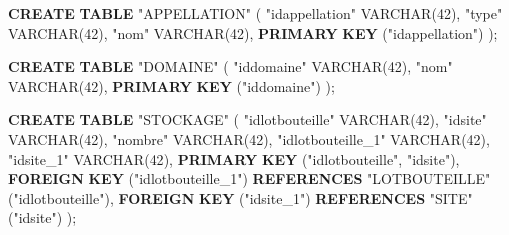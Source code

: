 \documentclass[11pt]{article}
\newenvironment{Shaded}{}{}
\newcommand{\KeywordTok}[1]{\textcolor[rgb]{0.00,0.44,0.13}{\textbf{{#1}}}}
\newcommand{\DataTypeTok}[1]{\textcolor[rgb]{0.56,0.13,0.00}{{#1}}}
\newcommand{\DecValTok}[1]{\textcolor[rgb]{0.25,0.63,0.44}{{#1}}}
\newcommand{\OtherTok}[1]{\textcolor[rgb]{0.00,0.44,0.13}{{#1}}}
\newcommand{\NormalTok}[1]{{#1}}
\begin{document}
\begin{Shaded}
\begin{Highlighting}[]
\KeywordTok{CREATE} \KeywordTok{TABLE} \OtherTok{"APPELLATION"}\NormalTok{ (}
  \OtherTok{"idappellation"} \DataTypeTok{VARCHAR}\NormalTok{(}\DecValTok{42}\NormalTok{),}
  \OtherTok{"type"} \DataTypeTok{VARCHAR}\NormalTok{(}\DecValTok{42}\NormalTok{),}
  \OtherTok{"nom"} \DataTypeTok{VARCHAR}\NormalTok{(}\DecValTok{42}\NormalTok{),}
  \KeywordTok{PRIMARY} \KeywordTok{KEY}\NormalTok{ (}\OtherTok{"idappellation"}\NormalTok{)}
\NormalTok{);}

\KeywordTok{CREATE} \KeywordTok{TABLE} \OtherTok{"DOMAINE"}\NormalTok{ (}
  \OtherTok{"iddomaine"} \DataTypeTok{VARCHAR}\NormalTok{(}\DecValTok{42}\NormalTok{),}
  \OtherTok{"nom"} \DataTypeTok{VARCHAR}\NormalTok{(}\DecValTok{42}\NormalTok{),}
  \KeywordTok{PRIMARY} \KeywordTok{KEY}\NormalTok{ (}\OtherTok{"iddomaine"}\NormalTok{)}
\NormalTok{);}

\KeywordTok{CREATE} \KeywordTok{TABLE} \OtherTok{"STOCKAGE"}\NormalTok{ (}
  \OtherTok{"idlotbouteille"} \DataTypeTok{VARCHAR}\NormalTok{(}\DecValTok{42}\NormalTok{),}
  \OtherTok{"idsite"} \DataTypeTok{VARCHAR}\NormalTok{(}\DecValTok{42}\NormalTok{),}
  \OtherTok{"nombre"} \DataTypeTok{VARCHAR}\NormalTok{(}\DecValTok{42}\NormalTok{),}
  \OtherTok{"idlotbouteille\_1"} \DataTypeTok{VARCHAR}\NormalTok{(}\DecValTok{42}\NormalTok{),}
  \OtherTok{"idsite\_1"} \DataTypeTok{VARCHAR}\NormalTok{(}\DecValTok{42}\NormalTok{),}
  \KeywordTok{PRIMARY} \KeywordTok{KEY}\NormalTok{ (}\OtherTok{"idlotbouteille"}\NormalTok{, }\OtherTok{"idsite"}\NormalTok{),}
  \KeywordTok{FOREIGN} \KeywordTok{KEY}\NormalTok{ (}\OtherTok{"idlotbouteille\_1"}\NormalTok{) }\KeywordTok{REFERENCES} \OtherTok{"LOTBOUTEILLE"}\NormalTok{ (}\OtherTok{"idlotbouteille"}\NormalTok{),}
  \KeywordTok{FOREIGN} \KeywordTok{KEY}\NormalTok{ (}\OtherTok{"idsite\_1"}\NormalTok{) }\KeywordTok{REFERENCES} \OtherTok{"SITE"}\NormalTok{ (}\OtherTok{"idsite"}\NormalTok{)}
\NormalTok{);}


\end{Highlighting}
\end{Shaded}
\end{document}
